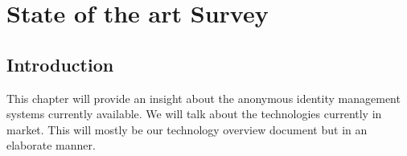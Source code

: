 \chapter{State of the art Survey}

\section{Introduction}
This chapter will provide an insight about the anonymous identity management systems currently available. We will talk about the technologies currently in market. This will mostly be our technology overview document but in an elaborate manner.
 

